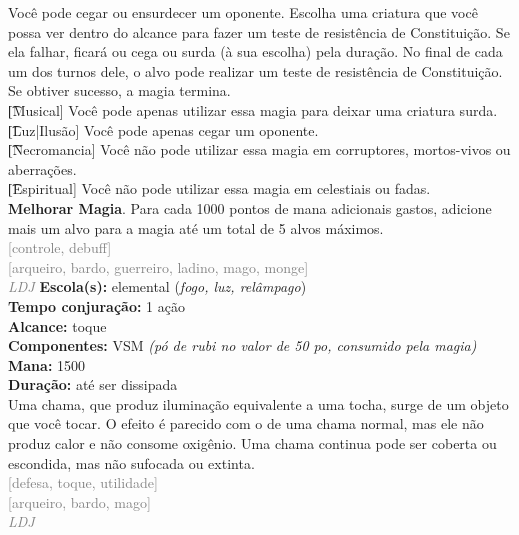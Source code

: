 \documentclass{RPG_Adventure}[2021/10/20]
\begin{document}
{\normalsize Você pode cegar ou ensurdecer um oponente. Escolha uma criatura que você possa ver dentro do alcance para fazer um teste de resistência de Constituição. Se ela falhar, ficará ou cega ou surda (à sua escolha) pela duração. No final de cada um dos turnos dele, o alvo pode realizar um teste de resistência de Constituição. Se obtiver sucesso, a magia termina.\\\t [Musical] Você pode apenas utilizar essa magia para deixar uma criatura surda.\\\t [Luz|Ilusão] Você pode apenas cegar um oponente.\\\t [Necromancia] Você não pode utilizar essa magia em corruptores, mortos-vivos ou aberrações.\\\t [Espiritual] Você não pode utilizar essa magia em celestiais ou fadas.\\\t \textbf{Melhorar Magia}. Para cada 1000 pontos de mana adicionais gastos, adicione mais um alvo para a magia até um total de 5 alvos máximos.\\}
{\scriptsize \textcolor{gray}{[controle, debuff]\\}}
{\scriptsize \textcolor{gray}{[arqueiro, bardo, guerreiro, ladino, mago, monge]\\}}
{\tiny \textcolor{gray}{\textit{LDJ}}}\jump{}
{\small \t \textbf{Escola(s):} elemental (\textit{fogo, luz, relâmpago})\\\t \textbf{Tempo conjuração:} 1 ação\\\t \textbf{Alcance:} toque\\\t \textbf{Componentes:} VSM \textit{(pó de rubi no valor de 50 po, consumido pela magia)}\\\t \textbf{Mana:} 1500\\\t \textbf{Duração:} até ser dissipada\\}
{\normalsize Uma chama, que produz iluminação equivalente a uma tocha, surge de um objeto que você tocar. O efeito é parecido com o de uma chama normal, mas ele não produz calor e não consome oxigênio. Uma chama continua pode ser coberta ou escondida, mas não sufocada ou extinta.\\}
{\scriptsize \textcolor{gray}{[defesa, toque, utilidade]\\}}
{\scriptsize \textcolor{gray}{[arqueiro, bardo, mago]\\}}
{\tiny \textcolor{gray}{\textit{LDJ}}}\jump{}
\end{document}
